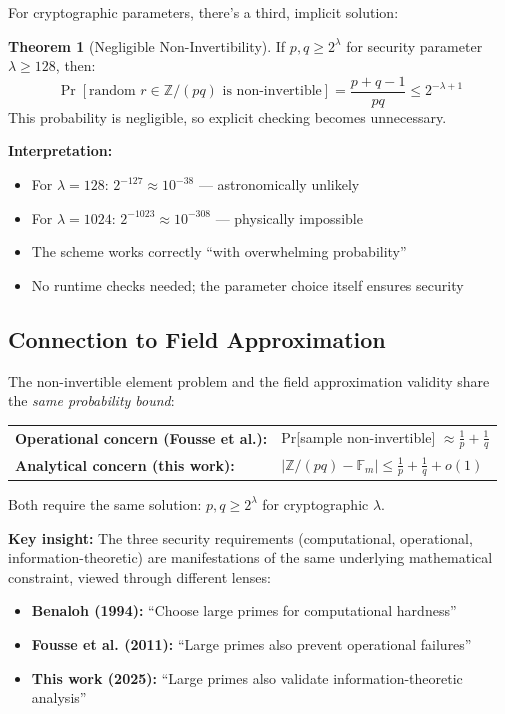 \documentclass[11pt]{article}
\theoremstyle{definition}
\newtheorem{theorem}{Theorem}
\begin{document}
For cryptographic parameters, there's a third, implicit solution:

\begin{theorem}[Negligible Non-Invertibility]
If $p, q \geq 2^{\lambda}$ for security parameter $\lambda \geq 128$, then:
\[
\Pr[\text{random } r \in \mathbb{Z}/(pq) \text{ is non-invertible}] 
= \frac{p + q - 1}{pq} \leq 2^{-\lambda+1}
\]
This probability is negligible, so explicit checking becomes unnecessary.
\end{theorem}

\textbf{Interpretation:}
\begin{itemize}
\item For $\lambda = 128$: $2^{-127} \approx 10^{-38}$ --- astronomically unlikely
\item For $\lambda = 1024$: $2^{-1023} \approx 10^{-308}$ --- physically impossible
\item The scheme works correctly ``with overwhelming probability''
\item No runtime checks needed; the parameter choice itself ensures security
\end{itemize}

\subsection{Connection to Field Approximation}

The non-invertible element problem and the field approximation validity share the \emph{same probability bound}:

\begin{center}
\begin{tabular}{ll}
\textbf{Operational concern (Fousse et al.):} & Pr[sample non-invertible] $\approx \frac{1}{p} + \frac{1}{q}$ \\
\textbf{Analytical concern (this work):} & $|\mathbb{Z}/(pq) - \mathbb{F}_m| \leq \frac{1}{p} + \frac{1}{q} + o(1)$ \\
\end{tabular}
\end{center}

Both require the same solution: $p, q \geq 2^{\lambda}$ for cryptographic $\lambda$.

\textbf{Key insight:} The three security requirements (computational, operational, information-theoretic) are manifestations of the same underlying mathematical constraint, viewed through different lenses:
\begin{itemize}
\item \textbf{Benaloh (1994):} ``Choose large primes for computational hardness''
\item \textbf{Fousse et al. (2011):} ``Large primes also prevent operational failures''
\item \textbf{This work (2025):} ``Large primes also validate information-theoretic analysis''
\end{itemize}
\end{document}
